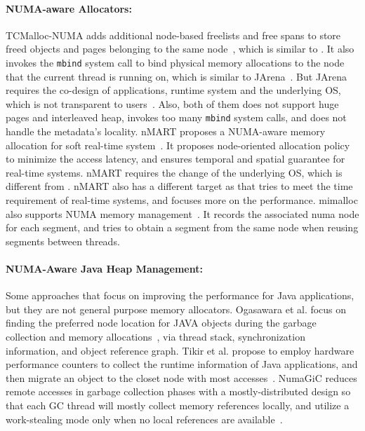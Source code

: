 \paragraph{NUMA-aware Allocators:} TCMalloc-NUMA adds additional node-based freelists and free spans to store freed objects and pages belonging to the same node~\citep{tcmallocnew}, which is similar to \NM{}. It also invokes the \texttt{mbind} system call to bind physical memory allocations to the node that the current thread is running on, which is similar to JArena~\citep{yang2019jarena}. But JArena requires the co-design of applications, runtime system and the underlying OS, which is not transparent to users~\citep{yang2019jarena}. Also, both of them does not support huge pages and interleaved heap, invokes too many \texttt{mbind} system calls, and does not handle the metadata's locality. nMART proposes a NUMA-aware memory allocation for soft real-time system~\citep{kim2013node}. It proposes node-oriented allocation policy to minimize the access latency, and ensures temporal and spatial guarantee for real-time systems. nMART requires the change of the underlying OS, which is different from \NM{}. nMART also has a different target as \NM{} that tries to meet the time requirement of real-time systems, and \NM{} focuses more on the performance. mimalloc also supports NUMA memory management~\citep{mimalloc}. It records the associated numa node for each segment, and tries to obtain a segment from the same node when reusing segments between threads. 


\paragraph{NUMA-Aware Java Heap Management:} Some approaches that focus on improving the performance for Java applications, but they are not general purpose memory allocators. Ogasawara et al. focus on finding the preferred node location for JAVA objects during the garbage collection and memory allocations~\citep{Ogasawara:2009:NMM:1640089.1640117}, via thread stack, synchronization information, and object reference graph. Tikir et al. propose to employ hardware performance counters to collect the runtime information of Java applications, and then migrate an object to the closet node with most accesses~\citep{1419934}. 
NumaGiC reduces remote accesses in garbage collection phases with a mostly-distributed design so that each GC thread will mostly collect memory references locally, and utilize a work-stealing mode only when no local references are available~\citep{NumaGiC}.


